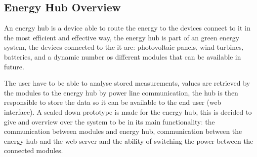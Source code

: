 \subsection{Energy Hub Overview}
An energy hub is a device able to route the energy to the devices connect to it in the most efficient and effective way, the energy hub is part of an green energy system, the devices connected to the it are: photovoltaic panels, wind turbines, batteries, and a dynamic number os different modules that can be available in future. 

The user have to be able to analyse stored measurements, values are retrieved by the modules to the energy hub by power line communication, the hub is then responsible to store the data so it can be available to the end user (web interface). A scaled down prototype is made for the energy hub, this is decided to give and overview over the system to be in its main functionality: the communication between modules and energy hub, communication between the energy hub and the web server and the ability of switching the power between the connected modules.